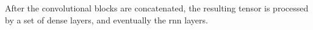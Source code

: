 
After the convolutional blocks are concatenated, the
resulting tensor is processed by a set of dense layers, and
eventually the \gls{rnn} layers.
